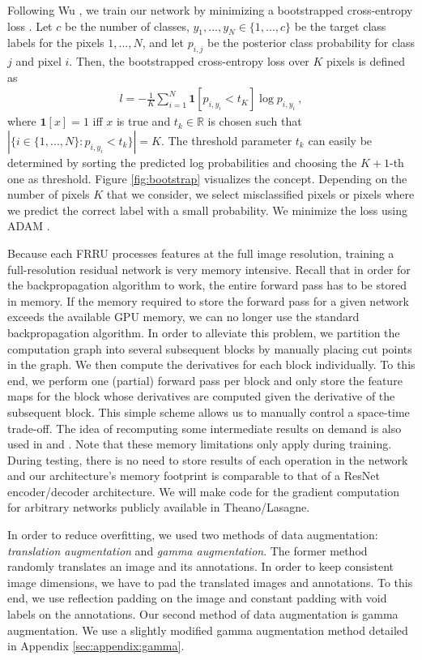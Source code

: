 \documentclass[10pt,twocolumn,letterpaper]{article}
\begin{document}
Following Wu \etal, we train our network by minimizing a bootstrapped cross-entropy loss \cite{Wu16ARXIV}.
Let $c$ be the number of classes, $y_1,...,y_N \in \{1,...,c\}$ be the target class labels for the pixels $1,...,N$,
and let $p_{i,j}$ be the posterior class probability for class $j$ and pixel $i$. Then, the bootstrapped cross-entropy loss over $K$ pixels is defined as
\begin{align}
l = - \frac{1}{K} \sum_{i = 1}^N \mathbf{1}[p_{i, y_i} < t_K] \log p_{i, y_i} ~,
\end{align}
where $\mathbf{1}[x] = 1$ iff $x$ is true and $t_k \in \mathbb{R}$ is chosen such that $\left|\{i \in \{1,...,N\} : p_{i, y_i} < t_k \} \right| = K$.
The threshold parameter $t_k$ can easily be determined by sorting the predicted log probabilities and choosing the $K+1$-th one as threshold.
Figure \ref{fig:bootstrap} visualizes the concept.
Depending on the number of pixels $K$ that we consider, we select misclassified pixels or pixels where we predict the correct label with a small probability.
We minimize the loss using ADAM \cite{Kingma15ICLR}.

Because each FRRU processes features at the full image resolution, training a full-resolution residual network is very memory intensive.
Recall that in order for the backpropagation algorithm \cite{Rumelhart86Nature} to work, the entire forward pass has to be stored in memory.
If the memory required to store the forward pass for a given network exceeds the available GPU memory, we can no longer use the standard backpropagation algorithm.
In order to alleviate this problem, we partition the computation graph into several subsequent blocks by manually placing cut points in the graph.
We then compute the derivatives for each block individually.
To this end, we perform one (partial) forward pass per block and only store the feature maps for the block whose derivatives are computed given the derivative of the subsequent block.
This simple scheme allows us to manually control a space-time trade-off.
The idea of recomputing some intermediate results on demand is also used in \cite{Gruslys16ARXIV} and \cite{TChen16ARXIV}.
Note that these memory limitations only apply during training.
During testing, there is no need to store results of each operation in the network and our architecture's memory footprint is comparable to that of a ResNet encoder/decoder architecture.
We will make code for the gradient computation for arbitrary networks publicly available in Theano/Lasagne.

In order to reduce overfitting, we used two methods of data augmentation: \emph{translation augmentation} and \emph{gamma augmentation}.
The former method randomly translates an image and its annotations.
In order to keep consistent image dimensions, we have to pad the translated images and annotations.
To this end, we use reflection padding on the image and constant padding with void labels on the annotations.
Our second method of data augmentation is gamma augmentation. We use a slightly modified gamma augmentation method detailed in Appendix \ref{sec:appendix:gamma}.
\end{document}
